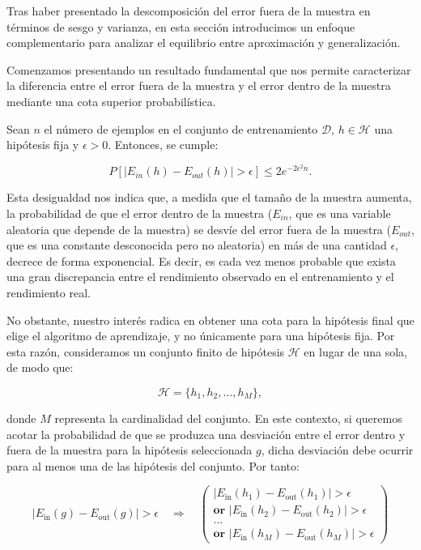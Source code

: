 Tras haber presentado la descomposición del error fuera de la muestra en términos de sesgo y varianza, en esta sección introducimos un enfoque complementario para analizar el equilibrio entre aproximación y generalización.

Comenzamos presentando un resultado fundamental que nos permite caracterizar la diferencia entre el error fuera de la muestra y el error dentro de la muestra mediante una cota superior probabilística.

\begin{definicion}
    Sean $n$ el número de ejemplos en el conjunto de entrenamiento $\mathcal{D}$, $h \in \mathcal{H}$ una hipótesis fija y $\epsilon > 0$. Entonces, se cumple:

    \[
        P\left[ \left| E_{in}(h) - E_{out}(h) \right| > \epsilon \right] \leq 2 e^{-2\epsilon^2 n}.
    \]
\end{definicion}

Esta desigualdad nos indica que, a medida que el tamaño de la muestra aumenta, la probabilidad de que el error dentro de la muestra ($E_{in}$, que es una variable aleatoria que depende de la muestra) se desvíe del error fuera de la muestra ($E_{out}$, que es una constante desconocida pero no aleatoria) en más de una cantidad $\epsilon$, decrece de forma exponencial. Es decir, es cada vez menos probable que exista una gran discrepancia entre el rendimiento observado en el entrenamiento y el rendimiento real.

No obstante, nuestro interés radica en obtener una cota para la hipótesis final que elige el algoritmo de aprendizaje, y no únicamente para una hipótesis fija. Por esta razón, consideramos un conjunto finito de hipótesis $\mathcal{H}$ en lugar de una sola, de modo que:

\[
    \mathcal{H} = \{h_1, h_2, \ldots, h_M\},
\]

donde $M$ representa la cardinalidad del conjunto. En este contexto, si queremos acotar la probabilidad de que se produzca una desviación entre el error dentro y fuera de la muestra para la hipótesis seleccionada $g$, dicha desviación debe ocurrir para al menos una de las hipótesis del conjunto. Por tanto:

\[
    \left| E_{\text{in}}(g) - E_{\text{out}}(g) \right| > \epsilon 
    \quad \Rightarrow \quad
    \left(
    \begin{array}{l}
    \left| E_{\text{in}}(h_1) - E_{\text{out}}(h_1) \right| > \epsilon \\
    \textbf{or } \left| E_{\text{in}}(h_2) - E_{\text{out}}(h_2) \right| > \epsilon \\
    \ldots \\
    \textbf{or } \left| E_{\text{in}}(h_M) - E_{\text{out}}(h_M) \right| > \epsilon
    \end{array}
    \right)
\]

